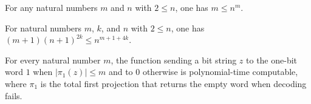 \begin{lemma}
\label{Complexity.le_pow_self_of_two_le}
\leanok
{}
For any natural numbers $m$ and $n$ with $2 \le n$, one has $m \le n^m$.
\end{lemma}

\begin{lemma}
\label{Complexity.mul_succ_pow_le_pow}
\leanok
{}
For natural numbers $m$, $k$, and $n$ with $2\le n$, one has $(m+1)(n+1)^{2k}\le
n^{m+1+4k}$.
\end{lemma}

\begin{lemma}
\label{Complexity.polyTimeComputable_lenFstLe}
\leanok
{}
For every natural number $m$, the function sending a bit string $z$ to the one-bit word
$1$ when $|\pi_1(z)|\le m$ and to $0$ otherwise is polynomial-time computable, where
$\pi_1$ is the total first projection that returns the empty word when decoding fails.
\end{lemma}

